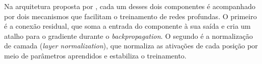 Na arquitetura proposta por , cada um desses dois componentes é
acompanhado por dois mecanismos que facilitam o treinamento de redes profundas. O primeiro é a
conexão residual, que soma a entrada do componente à sua saída e cria um atalho para o
gradiente durante o \textit{backpropagation}. O segundo é a normalização de camada
(\textit{layer normalization}), que normaliza as ativações de cada posição por meio de
parâmetros aprendidos e estabiliza o treinamento.




